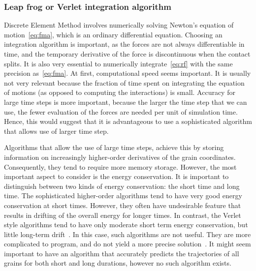 \subsubsection{Leap frog or Verlet integration algorithm}

Discrete Element Method involves numerically solving Newton's equation of 
motion~\cref{eq:fma}, which is an ordinary differential equation. Choosing an 
integration algorithm is important, as the forces are not always differentiable 
in time, and the temporary derivative of the force is discontinuous when the 
contact splits. It is also very essential to numerically integrate~\cref{eq:rf} 
with the same precision as~\cref{eq:fma}. At first, computational speed seems 
important. It is usually not very relevant because the fraction of time spent 
on integrating the equation of motions (as opposed to computing the 
interactions) is small. Accuracy for large time steps is more important, 
because the larger the time step that we can use, the fewer evaluation of the 
forces are needed per unit of simulation time. Hence, this would suggest that 
it is advantageous to use a sophisticated algorithm that allows use of larger 
time step. 

Algorithms that allow the use of large time steps, achieve this by storing 
information on increasingly higher-order derivatives of the 
grain coordinates. Consequently, they tend to require more memory storage. 
However, the most important aspect to consider is the energy conservation. It 
is important to distinguish between two kinds of energy conservation: the short 
time and long time. The sophisticated higher-order algorithms tend to have very 
good energy conservation at short times. However, they often have undesirable 
feature that results in drifting of the overall energy for longer times. In 
contrast, the Verlet style algorithms tend to have only moderate short term 
energy conservation, but little long-term drift~\citep{Frenkel1996}. In this 
case, such algorithms are not useful. They are more complicated to program, and 
do not yield a more precise solution~\citep{Radjai2011}. It might seem 
important to have an algorithm that accurately predicts the trajectories of 
all grains for both short and long durations, however no such algorithm exists.


